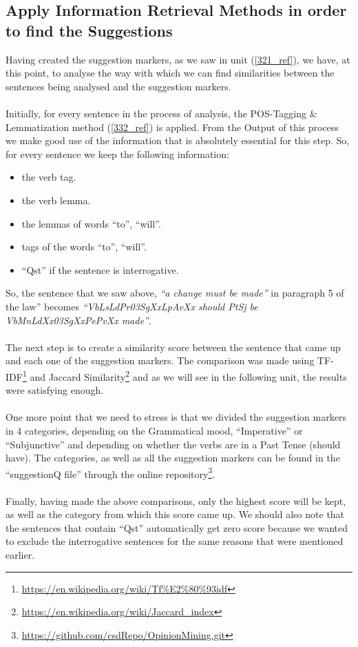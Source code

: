 \subsection{Apply Information Retrieval Methods in order to find the Suggestions}\label{333_ref}
Having created the suggestion markers, as we saw in unit (\ref{321_ref}), we have, at this point, to analyse the way with which we can find similarities between the sentences being analysed and the suggestion markers.\\
\\
Initially, for every sentence in the process of analysis, the POS-Tagging \& Lemmatization method (\ref{332_ref}) is applied. From the Output of this process we make good use of the information that is absolutely essential for this step. So, for every sentence we keep the following information:\\
\begin{itemize}

	\item the verb tag.
	\item the verb lemma.
	\item the lemmas of words ``to'', ``will''.
	\item tags of the words ``to'', ``will''.
	\item ``Qst'' if the sentence is interrogative.\\

\end{itemize}

So, the sentence that we saw above, \textit{``a change must be made''} in paragraph 5 of the law'' becomes \textit{``VbLsLdPr03SgXxLpAvXx should PtSj be VbMnLdXx03SgXxPePvXx made''}.\\
\\
The next step is to create a similarity score between the sentence that came up and each one of the suggestion markers. The comparison was made using TF-IDF\footnote{\url{https://en.wikipedia.org/wiki/Tf\%E2\%80\%93idf}} and Jaccard Similarity\footnote{\url{https://en.wikipedia.org/wiki/Jaccard_index}} and as we will see in the following unit, the results were satisfying enough.\\
\\
One more point that we need to stress is that we divided the suggestion markers in 4 categories, depending on the Grammatical mood, ``Imperative'' or ``Subjunctive'' and depending on whether the verbs are in a Past Tense (should have). The categories, as well as all the suggestion markers can be found in the ``suggestionQ file'' through the online repository\footnote{\url{https://github.com/csdRepo/OpinionMining.git}}.\\
\\
Finally, having made the above comparisons, only the highest score will be kept, as well as the category from which this score came up. We should also note that the sentences that contain ``Qst'' automatically get zero score because we wanted to exclude the interrogative sentences for the same reasons that were mentioned earlier.

